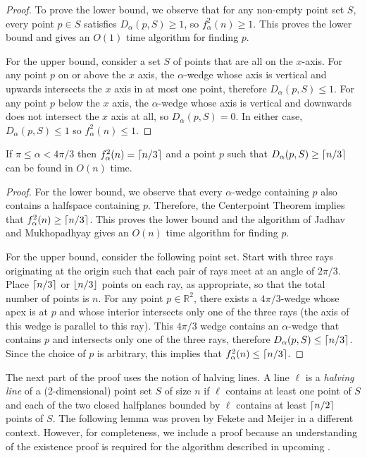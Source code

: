\documentclass[lotsofwhite]{patmorin}
\begin{document}
\begin{proof}
To prove the lower bound, we observe that for any non-empty
point set $S$, every point $p\in S$ satisfies $D_\alpha(p,S)\ge 1$, so
$f^2_\alpha(n) \ge 1$. This proves the lower bound and gives an $O(1)$
time algorithm for finding $p$. 

For the upper bound, consider a set $S$ of points that are all
on the $x$-axis.  For any point $p$ on or above the $x$ axis, the
$\alpha$-wedge whose axis is vertical and upwards intersects the $x$
axis in at most one point, therefore $D_\alpha(p,S) \le 1$.  For any
point $p$ below the $x$ axis, the $\alpha$-wedge whose axis is
vertical and downwards does not intersect the $x$ axis at all, so
$D_\alpha(p,S)=0$.  In either case, $D_\alpha(p,S)\le 1$ so $f^2_\alpha(n)
\le 1$.
\end{proof}

\begin{lem}
If $\pi\le \alpha < 4\pi/3$ then $f^2_\alpha(n) = \left\lceil n/3 \right\rceil$ and a
point $p$ such that $D_\alpha(p,S)\ge \left\lceil n/3 \right\rceil$ can be found in $O(n)$ time.
\end{lem}

\begin{proof} 
For the lower bound, we observe that every $\alpha$-wedge containing
$p$ also contains a halfspace containing $p$.  Therefore, the
Centerpoint Theorem implies that $f^2_\alpha(n) \ge \left\lceil n/3 \right\rceil$.  This
proves the lower bound and the algorithm of Jadhav and Mukhopadhyay
\cite{jm94} gives an $O(n)$ time algorithm for finding $p$.

For the upper bound, consider the following point set.  Start with
three rays originating at the origin such that each pair of rays meet at an
angle of $2\pi/3$.  Place $\left\lceil n/3 \right\rceil$ or $\left\lfloor n/3 \right\rfloor$ points on each
ray, as appropriate, so that the total number of points is $n$.  For
any point $p\in\mathbb{R}^2$, there exists a $4\pi/3$-wedge whose apex
is at $p$ and whose interior intersects only one of the three rays
(the axis of this wedge is parallel to this ray). This $4\pi/3$ wedge
contains an $\alpha$-wedge that contains $p$ and intersects only one
of the three rays, therefore $D_\alpha(p,S)\le \left\lceil n/3 \right\rceil$.  Since the
choice of $p$ is arbitrary, this implies that $f^2_\alpha(n) \le
\left\lceil n/3 \right\rceil$.  
\end{proof}

The next part of the proof uses the notion of halving lines.  A line
$\ell$ is a \emph{halving line} of a (2-dimensional) point set $S$ of
size $n$ if $\ell$ contains at least one point of $S$ and each of the
two closed halfplanes bounded by $\ell$ contains at least $\left\lceil n/2 \right\rceil$
points of $S$.  The following lemma was proven by Fekete and Meijer
\cite[Lemma~2]{fm00} in a different context.  However, for
completeness, we include a proof because an understanding of the
existence proof is required for the algorithm described in upcoming
.
\end{document}
